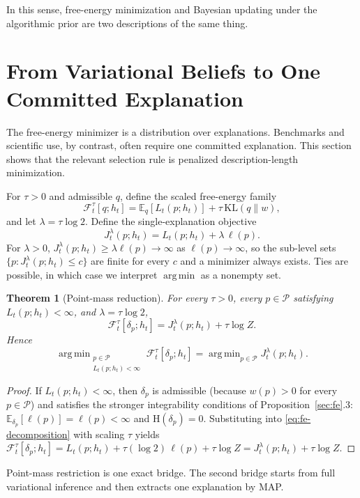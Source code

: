 \documentclass[11pt]{article}
\newtheorem{theorem}[definition]{Theorem}
\theoremstyle{remark}
\newcommand{\Pcal}{\mathcal{P}}
\newcommand{\Fcal}{\mathcal{F}}
\newcommand{\E}{\mathbb{E}}
\newcommand{\KL}{\mathrm{KL}}
\newcommand{\Hh}{\mathrm{H}}
\newcommand{\argmin}{\mathop{\mathrm{arg\,min}}}
\newcommand{\ellp}{\ell}
\begin{document}
In this sense, free-energy minimization and Bayesian updating under the algorithmic prior are two descriptions of the same thing.

\section{From Variational Beliefs to One Committed Explanation}
\label{sec:mdl}

The free-energy minimizer is a distribution over explanations. Benchmarks and scientific use, by contrast, often require one committed explanation. This section shows that the relevant selection rule is penalized description-length minimization.

For \(\tau>0\) and admissible \(q\), define the scaled free-energy family
\[
\Fcal_t^\tau[q;h_t]
= \E_q[L_t(p;h_t)] + \tau\,\KL(q\|w),
\]
and let \(\lambda = \tau \log 2\). Define the single-explanation objective
\[
J_t^\lambda(p;h_t) = L_t(p;h_t) + \lambda\,\ellp(p).
\]
For \(\lambda > 0\), \(J_t^\lambda(p;h_t) \ge \lambda \ell(p) \to \infty\) as \(\ell(p) \to \infty\), so the sub-level sets \(\{p : J_t^\lambda(p;h_t) \le c\}\) are finite for every \(c\) and a minimizer always exists. Ties are possible, in which case we interpret \(\argmin\) as a nonempty set.

\begin{theorem}[Point-mass reduction]
For every \(\tau>0\), every \(p\in\Pcal\) satisfying \(L_t(p;h_t)<\infty\), and \(\lambda=\tau\log 2\),
\[
\Fcal_t^\tau[\delta_p;h_t] = J_t^\lambda(p;h_t) + \tau \log Z.
\]
Hence
\[
\argmin_{\substack{p \in \Pcal\\ L_t(p;h_t)<\infty}} \Fcal_t^\tau[\delta_p;h_t]
= \argmin_{p \in \Pcal} J_t^\lambda(p;h_t).
\]
\end{theorem}

\begin{proof}
If \(L_t(p;h_t)<\infty\), then \(\delta_p\) is admissible (because \(w(p)>0\) for every \(p\in\Pcal\)) and satisfies the stronger integrability conditions of Proposition~\ref{sec:fe}.3: \(\E_{\delta_p}[\ell(p)]=\ell(p)<\infty\) and \(\Hh(\delta_p)=0\). Substituting into \eqref{eq:fe-decomposition} with scaling \(\tau\) yields
\(
\Fcal_t^\tau[\delta_p;h_t]
= L_t(p;h_t) + \tau(\log 2)\,\ellp(p) + \tau \log Z
= J_t^\lambda(p;h_t) + \tau \log Z.
\)
\end{proof}

Point-mass restriction is one exact bridge. The second bridge starts from full variational inference and then extracts one explanation by MAP.
\end{document}
